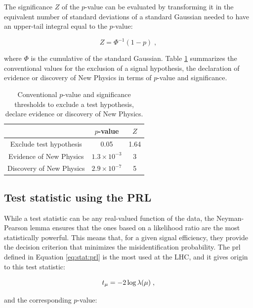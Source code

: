 The significance $Z$ of the $p$-value can be evaluated by transforming it in the equivalent number of standard deviations of a standard Gaussian needed to have an upper-tail integral equal to the $p$-value:

\begin{equation}
\label{eq:stat:sig}
Z = \Phi^{-1}(1-p) \; ,
\end{equation} 


\noindent where $\Phi$ is the cumulative of the standard Gaussian. Table \ref{tab:stat:thresholds} summarizes the conventional values for the exclusion of a signal hypothesis, the declaration of evidence or discovery of New Physics in terms of $p$-value and significance.

\begin{table}
\center
\begin{tabular}{|c|c|c|}
\hline 
 & $p$-value  & $Z$ \\ 
\hline 
\hline 
Exclude test hypothesis & 0.05 & 1.64 \\ 
\hline 
Evidence of New Physics & $1.3 \times 10^{-3}$ & 3 \\ 
\hline 
Discovery of New Physics & $2.9 \times 10^{-7}$ & 5 \\ 
\hline 
\end{tabular}
\caption{Conventional $p$-value and significance thresholds to exclude a test hypothesis, declare evidence or discovery of New Physics.}
\label{tab:stat:thresholds}
\end{table}




\subsection{Test statistic using the PRL}
\label{sec:teststat:prl}

While a test statistic can be any real-valued function of the data, the Neyman-Pearson lemma \cite{Neyman} ensures that the ones based on a likelihood ratio are the most statistically powerful. This means that, for a given signal efficiency, they provide the decision criterion that minimizes the misidentification probability. The \gls{prl} defined in Equation \ref{eq:stat:prl} is the most used at the LHC, and it gives origin to this test statistic:

\begin{equation}
\label{eq:stat:tmu}
t_{\mu} = -2 \log \lambda(\mu) \; ,
\end{equation}

\noindent and the corresponding $p$-value:

